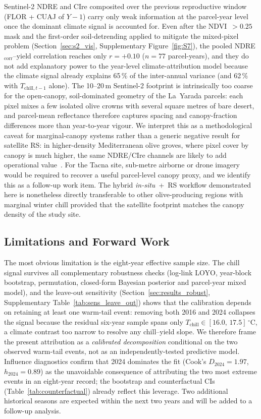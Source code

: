 \documentclass[agronomy,article,submit,pdftex,moreauthors]{Definitions/mdpi}
\begin{document}
Sentinel-2 NDRE and CIre composited over the previous reproductive window (FLOR + CUAJ of $Y-1$) carry only weak information at the parcel-year level once the dominant climate signal is accounted for. Even after the NDVI~$>0.25$ mask and the first-order soil-detrending applied to mitigate the mixed-pixel problem (Section~\ref{sec:s2_vis}, Supplementary Figure~\ref{fig:S7}), the pooled NDRE$_\text{corr}$--yield correlation reaches only $r=+0.10$ ($n=77$ parcel-years), and they do not add explanatory power to the year-level climate-attribution model because the climate signal already explains 65\,\% of the inter-annual variance (and 62\,\% with $T_{\text{chill},t-1}$ alone). The 10--20\,m Sentinel-2 footprint is intrinsically too coarse for the open-canopy, soil-dominated geometry of the La~Yarada parcels: each pixel mixes a few isolated olive crowns with several square metres of bare desert, and parcel-mean reflectance therefore captures spacing and canopy-fraction differences more than year-to-year vigour. We interpret this as a methodological caveat for marginal-canopy systems rather than a generic negative result for satellite RS: in higher-density Mediterranean olive groves, where pixel cover by canopy is much higher, the same NDRE/CIre channels are likely to add operational value~\cite{messina2022,leolini2022,wu2023rs}. For the Tacna site, sub-metre airborne or drone imagery would be required to recover a useful parcel-level canopy proxy, and we identify this as a follow-up work item. The hybrid \emph{in-situ}~+~RS workflow demonstrated here is nonetheless directly transferable to other olive-producing regions with marginal winter chill provided that the satellite footprint matches the canopy density of the study site.

\subsection{Limitations and Forward Work}
\label{sec:discuss_limits}

The most obvious limitation is the eight-year effective sample size. The chill signal survives all complementary robustness checks (log-link LOYO, year-block bootstrap, permutation, closed-form Bayesian posterior and parcel-year mixed model), and the leave-out sensitivity (Section~\ref{sec:results_robust}, Supplementary Table~\ref{tab:sens_leave_out}) shows that the calibration depends on retaining at least one warm-tail event: removing both 2016 and 2024 collapses the signal because the residual six-year sample spans only $T_{\text{chill}}\in[16.0,\,17.5]\,^\circ$C, a climate contrast too narrow to resolve any chill--yield slope. We therefore frame the present attribution as a \emph{calibrated decomposition} conditional on the two observed warm-tail events, not as an independently-tested predictive model. Influence diagnostics confirm that 2024 dominates the fit (Cook's $D_{2024}=1.97$, $h_{2024}=0.89$) as the unavoidable consequence of attributing the two most extreme events in an eight-year record; the bootstrap and counterfactual CIs (Table~\ref{tab:counterfactual}) already reflect this leverage. Two additional historical seasons are expected within the next two years and will be added to a follow-up analysis.
\end{document}
